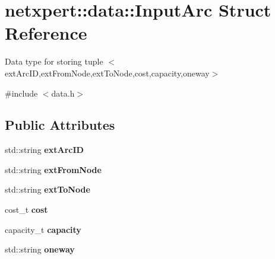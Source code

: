 \hypertarget{structnetxpert_1_1data_1_1InputArc}{}\section{netxpert\+:\+:data\+:\+:Input\+Arc Struct Reference}
\label{structnetxpert_1_1data_1_1InputArc}


Data type for storing tuple $<$ext\+Arc\+ID,ext\+From\+Node,ext\+To\+Node,cost,capacity,oneway$>$  




{\ttfamily \#include $<$data.\+h$>$}

\subsection*{Public Attributes}
\begin{DoxyCompactItemize}
\item 
std\+::string {\bfseries ext\+Arc\+ID}\hypertarget{structnetxpert_1_1data_1_1InputArc_aade488cd43daa40ff6a35360c86c993c}{}\label{structnetxpert_1_1data_1_1InputArc_aade488cd43daa40ff6a35360c86c993c}

\item 
std\+::string {\bfseries ext\+From\+Node}\hypertarget{structnetxpert_1_1data_1_1InputArc_a18891df1db94361fafa712470f278d0b}{}\label{structnetxpert_1_1data_1_1InputArc_a18891df1db94361fafa712470f278d0b}

\item 
std\+::string {\bfseries ext\+To\+Node}\hypertarget{structnetxpert_1_1data_1_1InputArc_ad2eab89deba0bbf05686ac5327e96228}{}\label{structnetxpert_1_1data_1_1InputArc_ad2eab89deba0bbf05686ac5327e96228}

\item 
cost\+\_\+t {\bfseries cost}\hypertarget{structnetxpert_1_1data_1_1InputArc_ab77d27ef459496b962b5145add83b74e}{}\label{structnetxpert_1_1data_1_1InputArc_ab77d27ef459496b962b5145add83b74e}

\item 
capacity\+\_\+t {\bfseries capacity}\hypertarget{structnetxpert_1_1data_1_1InputArc_aa893d560c2a228c1b6b2ca79f39293a2}{}\label{structnetxpert_1_1data_1_1InputArc_aa893d560c2a228c1b6b2ca79f39293a2}

\item 
std\+::string {\bfseries oneway}\hypertarget{structnetxpert_1_1data_1_1InputArc_aa80c616efeb9a1db5f930d9db0eb8def}{}\label{structnetxpert_1_1data_1_1InputArc_aa80c616efeb9a1db5f930d9db0eb8def}

\end{DoxyCompactItemize}


